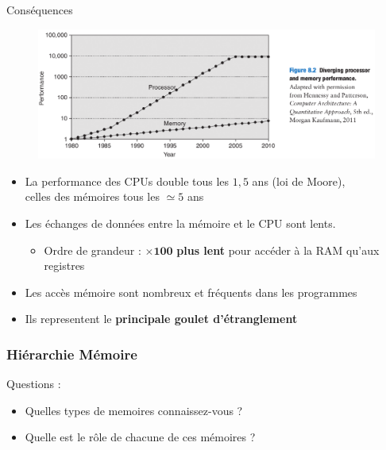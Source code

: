 \documentclass[8pt]{beamer}
\begin{document}
\begin{frame}{Cons\'equences}
    \begin{figure}[ht]
        \centering
        \centering
        \includegraphics[width=.75\linewidth]{figures/gap_cpu_ram_H.png}
        \label{fig:sub2}
    \end{figure}
    \begin{itemize}
        \item La performance des CPUs double tous les $1,5$ ans (loi de Moore),
              \\ celles des mémoires tous les $\simeq5$ ans
        \item Les \'echanges de données entre la mémoire et le CPU sont
              lents.
              \begin{itemize}
                  \item Ordre de grandeur : $\boldsymbol{\times}\textbf{100}$
                        \textbf{plus
                            lent}
                        pour
                        accéder
                        à la RAM qu'aux registres
              \end{itemize}
        \item Les acc\`es mémoire sont nombreux et fréquents dans les
              programmes
        \item Ils representent le \textbf{principale goulet d'\'etranglement}
    \end{itemize}
\end{frame}

\begin{frame}
    \frametitle{Hiérarchie Mémoire}

    \begin{alertblock}{Questions :}
        \begin{itemize}
            \item Quelles types de memoires connaissez-vous ?
            \item Quelle est le r\^ole de chacune de ces m\'emoires ?
        \end{itemize}
    \end{alertblock}
\end{frame}
\end{document}
